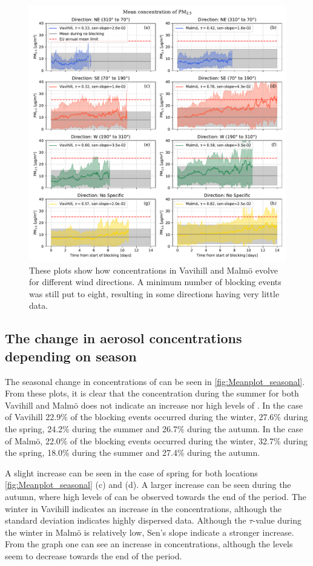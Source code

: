 \begin{figure}[H]
    \centering
    \includegraphics[width=\textwidth]{Figures/Meanplot_dir.pdf}
    \caption{These plots show how \PM concentrations in Vavihill and Malmö evolve for different wind directions. A minimum number of blocking events was still put to eight, resulting in some directions having very little data.}
    \label{fig:Meanplot_wind}
\end{figure}

 

\subsection{The change in aerosol concentrations depending on season}
The seasonal change in concentrations of \PM can be seen in \autoref{fig:Meanplot_seasonal}. From these plots, it is clear that the concentration during the summer for both Vavihill and Malmö does not indicate an increase nor high levels of \PM. In the case of Vavihill 22.9\% of the blocking events occurred during the winter, 27.6\% during the spring, 24.2\% during the summer and 26.7\% during the autumn. In the case of Malmö, 22.0\% of the blocking events occurred during the winter, 32.7\% during the spring, 18.0\% during the summer and 27.4\% during the autumn.

A slight increase can be seen in the case of spring for both locations \autoref{fig:Meanplot_seasonal} (c) and (d). A larger increase can be seen during the autumn, where high levels of \PM  can be observed towards the end of the period. The winter in Vavihill indicates an increase in the \PM  concentrations, although the standard deviation indicates highly dispersed data. Although the $\tau$-value during the winter in Malmö is relatively low, Sen's slope indicate a stronger increase. From the graph one can see an increase in \PM  concentrations, although the levels seem to decrease towards the end of the period. 

